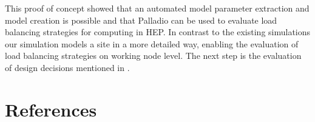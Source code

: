 \documentclass[a4paper]{jpconf}
\begin{document}
This proof of concept showed that an automated model parameter extraction and model creation is possible and that Palladio can be used to evaluate load balancing strategies for computing in HEP. In contrast to the existing simulations our simulation models a site in a more detailed way, enabling the evaluation of load balancing strategies on working node level. The next step is the evaluation of design decisions mentioned in .
\section*{References}

\end{document}
